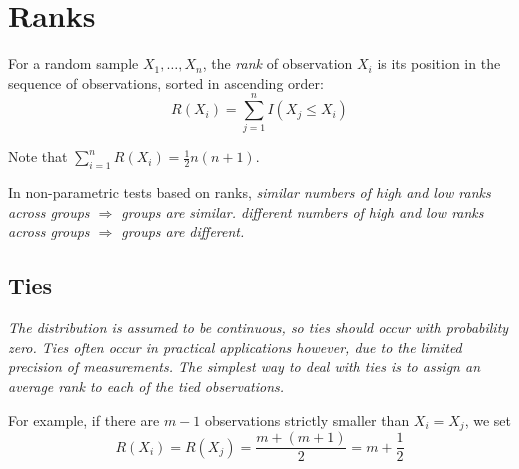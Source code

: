 
\section{Ranks}

\begin{definition}
For a random sample $X_1,\ldots,X_n$, the \emph{rank} of observation $X_i$ is its position in the sequence of observations, sorted in ascending order:
\[
R(X_i) = \sum_{j=1}^n I(X_j \leq X_i)
\]
\end{definition}
Note that $\displaystyle\sum_{i=1}^n R(X_i) = \frac{1}{2}n(n+1)$.

In non-parametric tests based on ranks,
\bit
\it similar numbers of high and low ranks across groups $\Rightarrow$ groups are similar.
\it different numbers of high and low ranks across groups $\Rightarrow$ groups are different.
\eit

\subsection{Ties}

\bit
\it The distribution is assumed to be continuous, so ties should occur with probability zero.
\it Ties often occur in practical applications however, due to the limited precision of measurements.
\it The simplest way to deal with ties is to assign an average rank to each of the tied observations.
\eit

For example, if there are $m-1$ observations strictly smaller than $X_i=X_j$, we set
\[
R(X_i) = R(X_j) = \frac{m+(m+1)}{2} = m+\frac{1}{2}
\]

